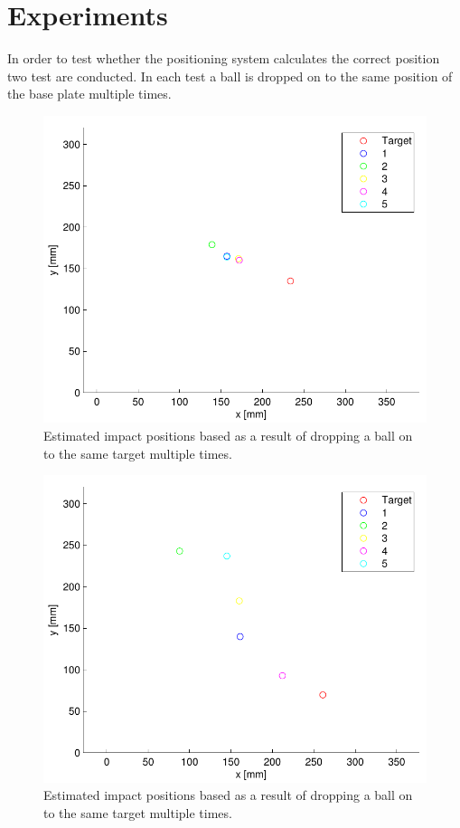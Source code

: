 \chapter{Experiments} %
\label{cha:experiments}

In order to test whether the positioning system calculates the correct position two test are conducted.
In each test a ball is dropped on to the same position of the base plate multiple times.

\begin{figure}[htb]
	\centering
	\includegraphics[width=.8\textwidth]{figures/testRes30deg.pdf}
	\caption{Estimated impact positions based as a result of dropping a ball on to the same target multiple times.}
	\label{fig:testRes30deg}
\end{figure}

\begin{figure}[htb]
	\centering
	\includegraphics[width=.8\textwidth]{figures/testRes15deg.pdf}
	\caption{Estimated impact positions based as a result of dropping a ball on to the same target multiple times.}
	\label{fig:testRes15deg}
\end{figure}

